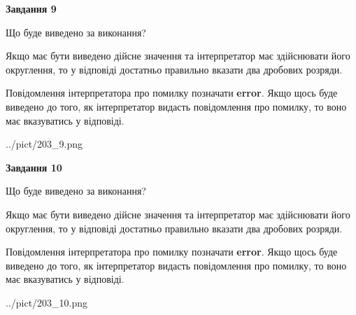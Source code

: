 \documentclass[12pt, ukrainian]{article}
\begin{document}
{\begin {Large}
{\begin {center}\textbf{Завдання 9}\end {center}}\par
Що буде виведено за виконання? \par

Якщо має бути виведено дійсне значення та інтерпретатор має здійснювати його округлення, 
то у відповіді достатньо правильно вказати два дробових розряди.

Повідомлення інтерпретатора про помилку позначати \textbf{error}.
Якщо щось буде виведено до того, як інтерпретатор видасть повідомлення про помилку, 
то воно має вказуватись у відповіді. \par

\begin{center}
	{../pict/203_9.png}
\end{center}
\newpage

{\begin {center}\textbf{Завдання 10}\end {center}}\par
Що буде виведено за виконання? \par

Якщо має бути виведено дійсне значення та інтерпретатор має здійснювати його округлення, 
то у відповіді достатньо правильно вказати два дробових розряди.

Повідомлення інтерпретатора про помилку позначати \textbf{error}.
Якщо щось буде виведено до того, як інтерпретатор видасть повідомлення про помилку, 
то воно має вказуватись у відповіді. \par

\begin{center}
	{../pict/203_10.png}
\end{center}
\newpage

\end {Large}}
\end{document}
